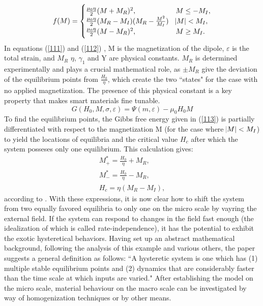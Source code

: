 \begin{multicols}{2}
\begin{equation}\label{112}
f(M)=\begin{cases} 
      \frac{\mu_0\eta}{2}(M+M_R)^2, & M\leq -M_I, \\
      \frac{\mu_0\eta}{2}(M_R-M_I)(M_R-\frac{M^2}{M_I}) & \abs{M}< M_I, \\
      \frac{\mu_0\eta}{2}(M-M_R)^2, & M\geq M_I.
   \end{cases}
\end{equation}
In equations (\ref{111}) and (\ref{112}) , M is the magnetization of the dipole, $\varepsilon$ is the total strain, and $M_R$ $\eta $, $\gamma_1$ and Y are physical constants. $M_R$ is determined experimentally and plays a crucial mathematical role, as $\pm M_R$ give the deviation of the equilibrium points from $\frac{H_0}{\eta}$, which create the two ``states" for the case with no applied magnetization. The presence of this physical constant is a key property that makes smart materials fine tunable.
\begin{equation}\label{113}
    G(H_0,M,\sigma,\varepsilon)=\Psi(m,\varepsilon)-\mu_0 H_0 M
\end{equation}
 To find the equilibrium points, the Gibbs free energy given in (\ref{113}) is partially differentiated with respect to the magnetization M (for the case where $\abs{M}<M_I $) to yield the locations of equilibria and the critical value $H_c$ after which the system posseses only one equilibrium. This calculation gives:
 \begin{align}
M^*_+=\frac{H_0}{\eta}+M_R, \label{114}\\
M^*_-=\frac{H_0}{\eta}-M_R,\\
H_c=\eta(M_R-M_I),\label{115}
\end{align}
according to \cite{morris2011hysteresis}.
With these expressions, it is now clear how to shift the system from two equally favored equilibria to only one on the micro scale by vayring the external field. If the system can respond to changes in the field fast enough (the idealization of which is called rate-independence), it has the potential to exhibit the exotic hysteretical behaviors. Having set up an abstract mathematical background, following the analysis of this example and various others, the paper suggests a general definition as follows:
``A hysteretic system is one which has (1) multiple stable equilibrium points and (2) dynamics that are considerably faster than the time scale at which inputs are varied." \cite{morris2011hysteresis} After establishing the model on the micro scale, material behaviour on the macro scale can be investigated by way of homogenization techniques or by other means.

\end{multicols}